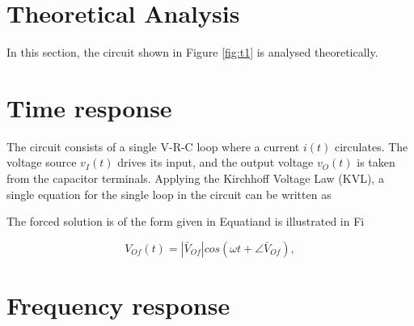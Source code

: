 \section{Theoretical Analysis}
\label{sec:analysis}

In this section, the circuit shown in Figure \ref{fig:t1} is analysed
theoretically.

\section{Time response}

The circuit consists of a single V-R-C loop where a current $i(t)$ circulates. The
voltage source $v_I(t)$ drives its input, and the output voltage $v_O(t)$ is taken from
the capacitor terminals. Applying the Kirchhoff Voltage Law (KVL), a single
equation for the single loop in the circuit can be written as



The forced solution is of the form given in Equatiand is
illustrated in Fi

\begin{equation}
  V_{Of}(t) = |\bar{V}_{Of}| cos(\omega t + \angle \bar{V}_{Of}),
  \label{eq:vo_for}
\end{equation}

\lipsum[1-1]


\section{Frequency response}

\lipsum[1-1]


